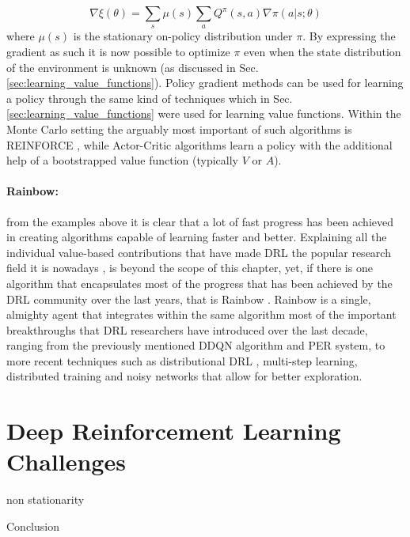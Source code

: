 \begin{equation}
	\nabla \xi(\theta) = \sum_{s} \mu(s) \sum_{a} Q^{\pi}(s,a) \nabla \pi(a|s;\theta)
\end{equation}
where $\mu(s)$ is the stationary on-policy distribution under $\pi$. By expressing the gradient as such it is now possible to optimize $\pi$ even when the state distribution of the environment is unknown (as discussed in Sec. \ref{sec:learning_value_functions}). Policy gradient methods can be used for learning a policy through the same kind of techniques which in Sec. \ref{sec:learning_value_functions} were used for learning value functions. Within the Monte Carlo setting the arguably most important of such algorithms is REINFORCE \cite{williams1992simple}, while Actor-Critic algorithms \cite{lillicrap2015continuous,schulman2015high,schulman2015trust,wang2016sample,mnih2016asynchronous,schulman2017proximal,haarnoja2018soft,fujimoto2018addressing} learn a policy with the additional help of a bootstrapped value function (typically $V$ or $A$).


\paragraph{Rainbow:} from the examples above it is clear that a lot of fast progress has been achieved in creating algorithms capable of learning faster and better. Explaining all the individual value-based contributions that have made DRL the popular research field it is nowadays \cite{henderson2018deep}, is beyond the scope of this chapter, yet, if there is one algorithm that encapsulates most of the progress that has been achieved by the DRL community over the last years, that is Rainbow \cite{hessel2018rainbow}. Rainbow is a single, almighty agent that integrates within the same algorithm most of the important breakthroughs that DRL researchers have introduced over the last decade, ranging from the previously mentioned DDQN algorithm and PER system, to more recent techniques such as distributional DRL \cite{bellemare2017distributional}, multi-step learning, distributed training \cite{mnih2016asynchronous} and noisy networks \cite{fortunato2017noisy} that allow for better exploration.


\section{Deep Reinforcement Learning Challenges}
\label{sec:challenges}
non stationarity


\begin{remark}{Conclusion}

\end{remark}



